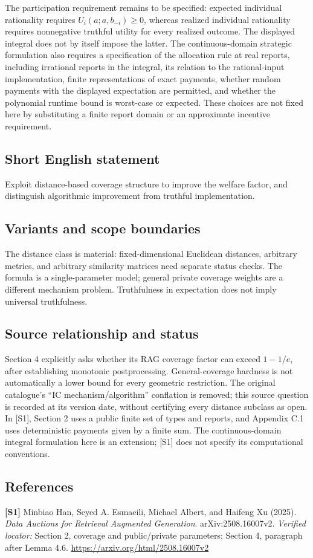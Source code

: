 \documentclass[11pt,a4paper]{article}
\begin{document}
The participation requirement remains to be specified: expected individual rationality requires $U_i(a;a,b_{-i})\geq0$, whereas realized individual rationality requires nonnegative truthful utility for every realized outcome. The displayed integral does not by itself impose the latter. The continuous-domain strategic formulation also requires a specification of the allocation rule at real reports, including irrational reports in the integral, its relation to the rational-input implementation, finite representations of exact payments, whether random payments with the displayed expectation are permitted, and whether the polynomial runtime bound is worst-case or expected. These choices are not fixed here by substituting a finite report domain or an approximate incentive requirement.
\subsection*{Short English statement}
Exploit distance-based coverage structure to improve the welfare factor, and distinguish algorithmic improvement from truthful implementation.
\subsection*{Variants and scope boundaries}
The distance class is material: fixed-dimensional Euclidean distances, arbitrary metrics, and arbitrary similarity matrices need separate status checks. The formula is a single-parameter model; general private coverage weights are a different mechanism problem. Truthfulness in expectation does not imply universal truthfulness.
\subsection*{Source relationship and status}
Section 4 explicitly asks whether its RAG coverage factor can exceed $1-1/e$, after establishing monotonic postprocessing. General-coverage hardness is not automatically a lower bound for every geometric restriction. The original catalogue's ``IC mechanism/algorithm'' conflation is removed; this source question is recorded at its version date, without certifying every distance subclass as open.
In [S1], Section 2 uses a public finite set of types and reports, and Appendix C.1 uses deterministic payments given by a finite sum. The continuous-domain integral formulation here is an extension; [S1] does not specify its computational conventions.
\subsection*{References}
\begingroup\footnotesize\raggedright
\textbf{[S1]} Minbiao Han, Seyed A. Esmaeili, Michael Albert, and Haifeng Xu (2025). \emph{Data Auctions for Retrieval Augmented Generation}. arXiv:2508.16007v2. \textit{Verified locator:} Section 2, coverage and public/private parameters; Section 4, paragraph after Lemma 4.6. \url{https://arxiv.org/html/2508.16007v2}
\par\endgroup
\end{document}
